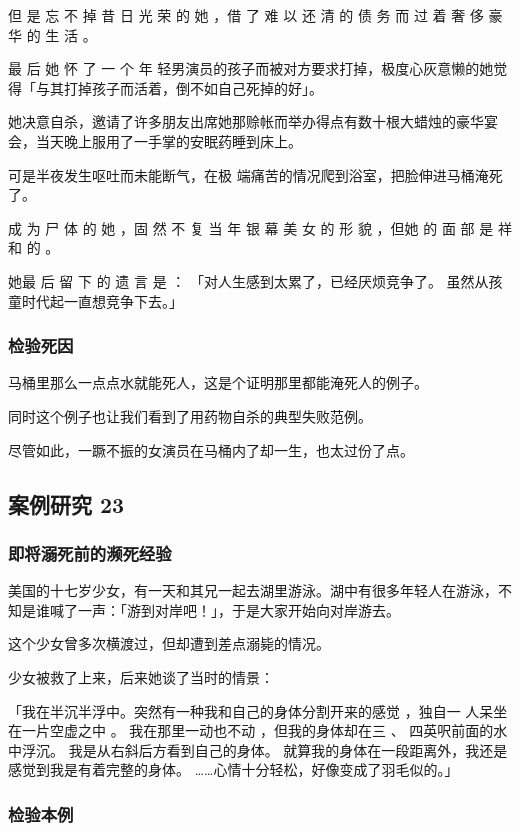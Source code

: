 \documentclass[UTF8]{ctexart}
\begin{document}
但 是 忘 不 掉 昔 日 光 荣 的 她 ，借 了 难 以 还 清 的 债 务 而 过 着 奢 侈 豪 华 的 生 活 。

最 后 她 怀 了 一 个 年 轻男演员的孩子而被对方要求打掉，极度心灰意懒的她觉得「与其打掉孩子而活着，倒不如自己死掉的好」。

她决意自杀，邀请了许多朋友出席她那赊帐而举办得点有数十根大蜡烛的豪华宴会，当天晚上服用了一手掌的安眠药睡到床上。

可是半夜发生呕吐而未能断气，在极 端痛苦的情况爬到浴室，把脸伸进马桶淹死了。

成 为 尸 体 的 她 ，固 然 不 复 当 年 银 幕 美 女 的 形 貌 ，但她 的 面 部 是 祥 和 的 。

她最 后 留 下 的 遗 言 是 ： 「对人生感到太累了，已经厌烦竞争了。
虽然从孩童时代起一直想竞争下去。」


\subsubsection*{检验死因}

马桶里那么一点点水就能死人，这是个证明那里都能淹死人的例子。

同时这个例子也让我们看到了用药物自杀的典型失败范例。 

尽管如此，一蹶不振的女演员在马桶内了却一生，也太过份了点。


\subsection{案例研究 23}

\subsubsection*{即将溺死前的濒死经验}

美国的十七岁少女，有一天和其兄一起去湖里游泳。湖中有很多年轻人在游泳，不知是谁喊了一声：「游到对岸吧！」，于是大家开始向对岸游去。

这个少女曾多次横渡过，但却遭到差点溺毙的情况。

少女被救了上来，后来她谈了当时的情景：

「我在半沉半浮中。突然有一种我和自己的身体分割开来的感觉 ，独自一 人呆坐在一片空虚之中 。
我在那里一动也不动 ，但我的身体却在三 、 四英呎前面的水中浮沉。
我是从右斜后方看到自己的身体。
就算我的身体在一段距离外，我还是感觉到我是有着完整的身体。
……心情十分轻松，好像变成了羽毛似的。」

\subsubsection*{检验本例}
\end{document}
